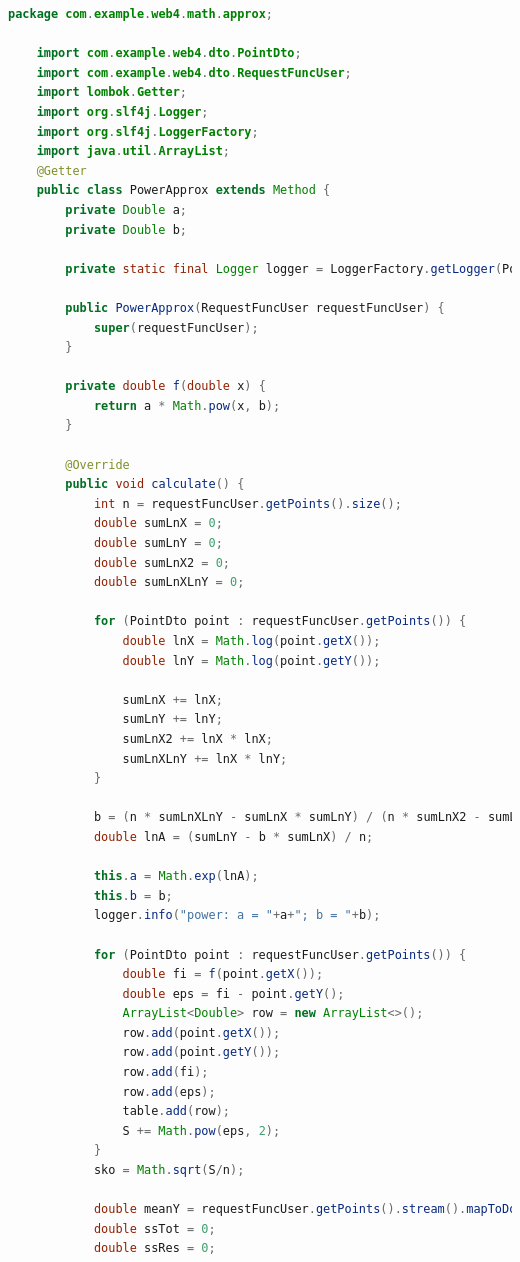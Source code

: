 \documentclass{article}
\begin{document}
\begin{lstlisting}[language=Java, caption={Степенная аппроксимация}]
    package com.example.web4.math.approx;

    import com.example.web4.dto.PointDto;
    import com.example.web4.dto.RequestFuncUser;
    import lombok.Getter;
    import org.slf4j.Logger;
    import org.slf4j.LoggerFactory;
    import java.util.ArrayList;
    @Getter
    public class PowerApprox extends Method {
        private Double a;
        private Double b;
    
        private static final Logger logger = LoggerFactory.getLogger(PowerApprox.class);
    
        public PowerApprox(RequestFuncUser requestFuncUser) {
            super(requestFuncUser);
        }
    
        private double f(double x) {
            return a * Math.pow(x, b);
        }
    
        @Override
        public void calculate() {
            int n = requestFuncUser.getPoints().size();
            double sumLnX = 0;
            double sumLnY = 0;
            double sumLnX2 = 0;
            double sumLnXLnY = 0;
    
            for (PointDto point : requestFuncUser.getPoints()) {
                double lnX = Math.log(point.getX());
                double lnY = Math.log(point.getY());
    
                sumLnX += lnX;
                sumLnY += lnY;
                sumLnX2 += lnX * lnX;
                sumLnXLnY += lnX * lnY;
            }
    
            b = (n * sumLnXLnY - sumLnX * sumLnY) / (n * sumLnX2 - sumLnX * sumLnX);
            double lnA = (sumLnY - b * sumLnX) / n;
    
            this.a = Math.exp(lnA);
            this.b = b;
            logger.info("power: a = "+a+"; b = "+b);
    
            for (PointDto point : requestFuncUser.getPoints()) {
                double fi = f(point.getX());
                double eps = fi - point.getY();
                ArrayList<Double> row = new ArrayList<>();
                row.add(point.getX());
                row.add(point.getY());
                row.add(fi);
                row.add(eps);
                table.add(row);
                S += Math.pow(eps, 2);
            }
            sko = Math.sqrt(S/n);
    
            double meanY = requestFuncUser.getPoints().stream().mapToDouble(PointDto::getY).average().orElse(0);
            double ssTot = 0;
            double ssRes = 0;
    

\end{lstlisting}
\end{document}
